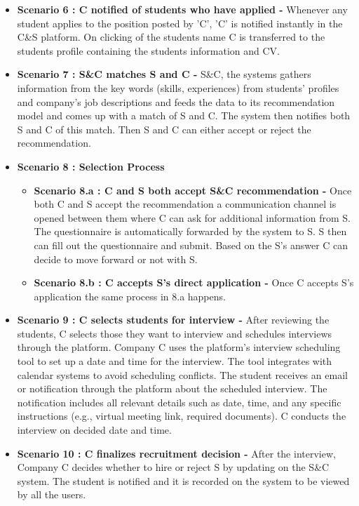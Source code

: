 \begin{itemize}
    \item \textbf{Scenario 6 : C notified of students who have applied - } Whenever any student applies to the position posted by 'C', 'C' is notified instantly in the C\&S platform. On clicking of the students name C is transferred to the students profile containing the students information and CV.
    \item \textbf{Scenario 7 : S\&C matches S and C - } S\&C, the systems gathers information from the key words (skills, experiences) from students' profiles and company's job descriptions and feeds the data to its recommendation model and comes up with a match of S and C. The system then notifies both S and C of this match. Then S and C can either accept or reject the recommendation.
    \item \textbf{Scenario 8 : Selection Process}
    \begin{itemize}
        \item \textbf{Scenario 8.a : C and S both accept S\&C recommendation  - } Once both C and S accept the recommendation a communication channel is opened between them where C can ask for additional information from S. The questionnaire is automatically forwarded by the system to S. S then can fill out the questionnaire and submit. Based on the S's answer C can decide to move forward or not with S.
        \item \textbf{Scenario 8.b : C accepts S's direct application  - } Once C accepts S's application the same process in 8.a happens.
    \end{itemize}
    
    \item \textbf{Scenario 9 : C selects students for interview - } After reviewing the students, C selects those they want to interview and schedules interviews through the platform. Company C uses the platform’s interview scheduling tool to set up a date and time for the interview. The tool integrates with calendar systems to avoid scheduling conflicts. The student receives an email or notification through the platform about the scheduled interview. The notification includes all relevant details such as date, time, and any specific instructions (e.g., virtual meeting link, required documents). C conducts the interview on decided date and time. 

    \item \textbf{Scenario 10 : C finalizes recruitment decision - } After the interview, Company C decides whether to hire or reject S by updating on the S\&C system. The student is notified and it is recorded on the system to be viewed by all the users.
    

\end{itemize}
